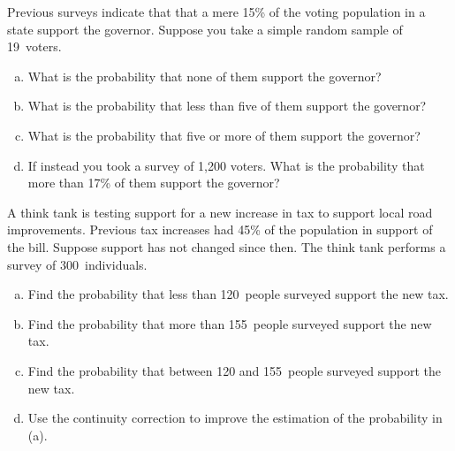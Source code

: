 \documentclass[11pt,letterpaper]{article}
\begin{document}

 Previous surveys indicate that that a mere 15\% of the voting population in a state support the governor. Suppose you take a simple random sample of 19~voters.
	\begin{enumerate}[(a)]
	\item What is the probability that none of them support the governor?
	\item What is the probability that less than five of them support the governor?
	\item What is the probability that five or more of them support the governor?
	\item If instead you took a survey of 1,200 voters. What is the probability that more than 17\% of them support the governor?
	\end{enumerate}



\newpage



 A think tank is testing support for a new increase in tax to support local road improvements. Previous tax increases had 45\% of the population in support of the bill. Suppose support has not changed since then. The think tank performs a survey of 300~individuals. 
	\begin{enumerate}[(a)]
	\item Find the probability that less than 120~people surveyed support the new tax.
	\item Find the probability that more than 155~people surveyed support the new tax.
	\item Find the probability that between 120 and 155~people surveyed support the new tax.
	\item Use the continuity correction to improve the estimation of the probability in (a).
	\end{enumerate}
\end{document}
